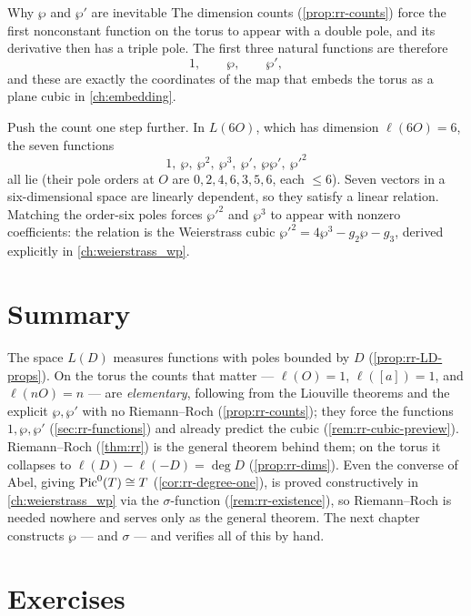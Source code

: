 \begin{keyidea}{Why \(\wp\) and \(\wp'\) are inevitable}
The dimension counts (\cref{prop:rr-counts}) force the first nonconstant function
on the torus to appear with a double pole, and its derivative then has a triple
pole. The first three natural functions are therefore
\[
  1, \qquad \wp, \qquad \wp' ,
\]
and these are exactly the coordinates of the map that embeds the torus as a plane
cubic in \cref{ch:embedding}.
\end{keyidea}

\begin{remark}
\label{rem:rr-cubic-preview}
Push the count one step further. In \(L(6O)\), which has dimension \(\ell(6O) =
6\), the seven functions
\[
  1,\ \wp,\ \wp^2,\ \wp^3,\ \wp',\ \wp\wp',\ \wp'^2
\]
all lie (their pole orders at \(O\) are \(0,2,4,6,3,5,6\), each \(\le 6\)). Seven
vectors in a six-dimensional space are linearly dependent, so they satisfy a
linear relation. Matching the order-six poles forces \(\wp'^2\) and \(\wp^3\) to
appear with nonzero coefficients: the relation is the Weierstrass cubic
\(\wp'^2 = 4\wp^3 - g_2\wp - g_3\), derived explicitly in
\cref{ch:weierstrass_wp}.
\end{remark}

\section{Summary}
\label{sec:rr-summary}

The space \(L(D)\) measures functions with poles bounded by \(D\)
(\cref{prop:rr-LD-props}). On the torus the counts that matter --- \(\ell(O) = 1\),
\(\ell([a]) = 1\), and \(\ell(nO) = n\) --- are \emph{elementary}, following from
the Liouville theorems and the explicit \(\wp, \wp'\) with no Riemann--Roch
(\cref{prop:rr-counts}); they force the functions \(1, \wp, \wp'\)
(\cref{sec:rr-functions}) and already predict the cubic
(\cref{rem:rr-cubic-preview}). Riemann--Roch (\cref{thm:rr}) is the general theorem
behind them; on the torus it collapses to \(\ell(D) - \ell(-D) = \deg D\)
(\cref{prop:rr-dims}). Even the converse of Abel, giving \(\operatorname{Pic}^0(T) \cong T\)
(\cref{cor:rr-degree-one}), is proved constructively in \cref{ch:weierstrass_wp}
via the \(\sigma\)-function (\cref{rem:rr-existence}), so Riemann--Roch is needed
nowhere and serves only as the general theorem. The next chapter constructs
\(\wp\) --- and \(\sigma\) --- and verifies all of this by hand.

\section*{Exercises}

